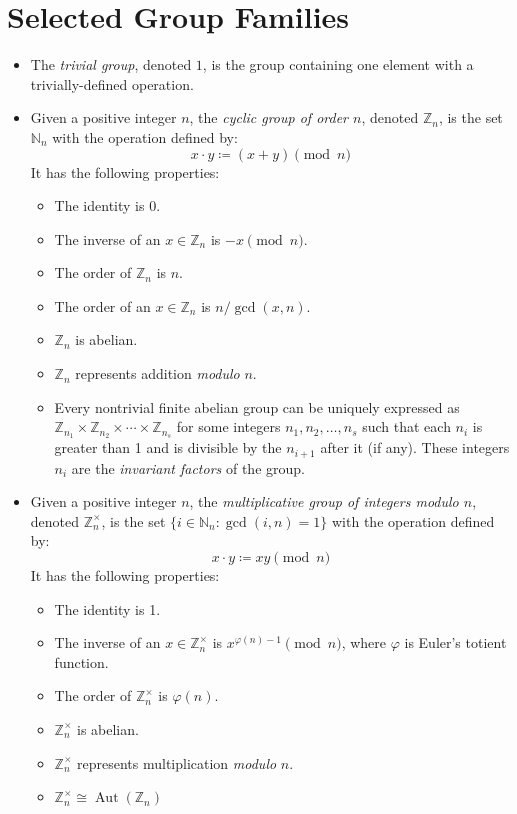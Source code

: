 \documentclass{article}
\newcommand{\N}{\mathbb{N}}
\newcommand{\Z}{\mathbb{Z}}
\DeclareMathOperator{\Aut}{Aut}
\begin{document}
\section{Selected Group Families}
\begin{itemize}
\item The \emph{trivial group}, denoted $1$, is the group containing one element with a trivially-defined operation.

\item Given a positive integer $n$, the \emph{cyclic group of order $n$}, denoted $\Z_n$, is the set $\N_n$ with the operation defined by: $$x\cdot y\coloneqq (x+y)\pmod{n}$$  It has the following properties:
 \begin{itemize}
 \item The identity is 0.
 \item The inverse of an $x\in\Z_n$ is $-x\pmod{n}$.
 \item The order of $\Z_n$ is $n$.
 \item The order of an $x\in\Z_n$ is $n/\gcd(x,n)$.
 \item $\Z_n$ is abelian.
 \item $\Z_n$ represents addition \emph{modulo} $n$.
 \item Every nontrivial finite abelian group can be uniquely expressed as $\Z_{n_1}\times\Z_{n_2}\times\cdots\times\Z_{n_s}$ for some integers $n_1, n_2, \ldots, n_s$ such that each $n_i$ is greater than 1 and is divisible by the $n_{i+1}$ after it (if any).  These integers $n_i$ are the \emph{invariant factors} of the group.
 \end{itemize}

\item Given a positive integer $n$, the \emph{multiplicative group of integers \emph{modulo} $n$}, denoted $\Z_n^\times$, is the set $\{i\in\N_n : \gcd(i,n) = 1\}$ with the operation defined by: $$x\cdot y\coloneqq xy\pmod{n}$$  It has the following properties:
 \begin{itemize}
 \item The identity is 1.
 \item The inverse of an $x\in\Z_n^\times$ is $x^{\varphi(n)-1}\pmod{n}$, where $\varphi$ is Euler's totient function.
 \item The order of $\Z_n^\times$ is $\varphi(n)$.
 \item $\Z_n^\times$ is abelian.
 \item $\Z_n^\times$ represents multiplication \emph{modulo} $n$.
 \item $\Z_n^\times \cong \Aut(\Z_n)$
 \end{itemize}


\end{itemize}
\end{document}
